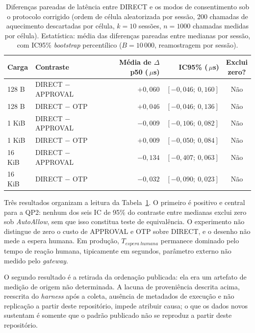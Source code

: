 \documentclass[12pt,openright,twoside,a4paper,english,brazil]{abntex2}
\newcommand{\micro}{\,$\mu$s}
\begin{document}
\begin{table}[htb]
\centering
\caption{Diferenças pareadas de latência entre DIRECT e os modos de consentimento sob o protocolo corrigido (ordem de célula aleatorizada por sessão, 200 chamadas de aquecimento descartadas por célula, $k=10$ sessões, $n=1000$ chamadas medidas por célula). Estatística: média das diferenças pareadas entre medianas por sessão, com IC95\% \textit{bootstrap} percentílico ($B=10\,000$, reamostragem por sessão).}
\label{tab:latencia-pareada-v2}
\begin{tabular}{@{}llrrc@{}}
\toprule
Carga & Contraste & \shortstack[r]{Média de\\$\Delta$ p50 (\micro)} & IC95\% (\micro) & \shortstack[c]{Exclui\\zero?} \\
\midrule
128 B  & DIRECT $-$ APPROVAL & $+0{,}060$ & $[-0{,}046;\ 0{,}160]$ & Não \\
128 B  & DIRECT $-$ OTP      & $+0{,}046$ & $[-0{,}046;\ 0{,}136]$ & Não \\
1 KiB  & DIRECT $-$ APPROVAL & $-0{,}009$ & $[-0{,}106;\ 0{,}082]$ & Não \\
1 KiB  & DIRECT $-$ OTP      & $+0{,}009$ & $[-0{,}050;\ 0{,}084]$ & Não \\
16 KiB & DIRECT $-$ APPROVAL & $-0{,}134$ & $[-0{,}407;\ 0{,}063]$ & Não \\
16 KiB & DIRECT $-$ OTP      & $-0{,}032$ & $[-0{,}090;\ 0{,}023]$ & Não \\
\bottomrule
\end{tabular}
\end{table}

Três resultados organizam a leitura da Tabela~\ref{tab:latencia-pareada-v2}. O primeiro é positivo e central para a QP2: nenhum dos seis IC de 95\% do contraste entre medianas exclui zero sob \textit{AutoAllow}, sem que isso constitua teste de equivalência. O experimento não distingue de zero o custo de APPROVAL e OTP sobre DIRECT, e o desenho não mede a espera humana. Em produção, $T_{espera\ humana}$ permanece dominado pelo tempo de reação humana, tipicamente em segundos, parâmetro externo não medido pelo \textit{gateway}.

O segundo resultado é a retirada da ordenação publicada: ela era um artefato de medição de origem não determinada. A lacuna de proveniência descrita acima, reescrita do \textit{harness} após a coleta, ausência de metadados de execução e não replicação a partir deste repositório, impede atribuir causa; o que os dados novos sustentam é somente que o padrão publicado não se reproduz a partir deste repositório.
\end{document}
